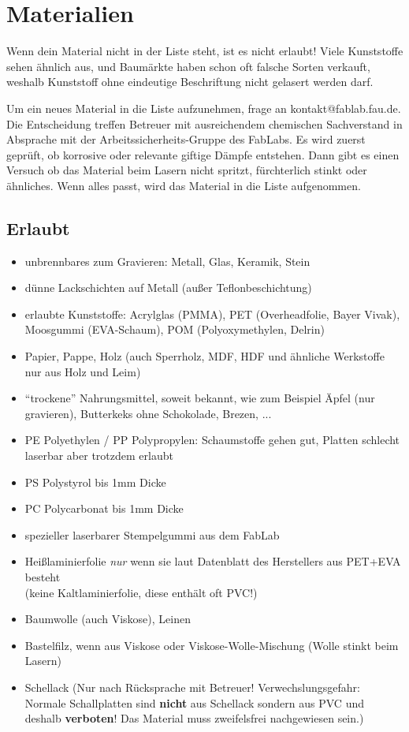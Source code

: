 \documentclass{\basedir/fablab-document}
\begin{document}
	\newpage %

	\section{Materialien}
	Wenn dein Material nicht in der Liste steht, ist es nicht erlaubt! Viele Kunststoffe sehen ähnlich aus, und Baumärkte haben schon oft falsche Sorten verkauft, weshalb Kunststoff ohne eindeutige Beschriftung nicht gelasert werden darf.

	Um ein neues Material in die Liste aufzunehmen, frage an kontakt@fablab.fau.de. Die Entscheidung treffen Betreuer mit ausreichendem chemischen Sachverstand in Absprache mit der Arbeitssicherheits-Gruppe des FabLabs. Es wird zuerst geprüft, ob korrosive oder relevante giftige Dämpfe entstehen. Dann gibt es einen Versuch ob das Material beim Lasern nicht spritzt, fürchterlich stinkt oder ähnliches. Wenn alles passt, wird das Material in die Liste aufgenommen.

	\subsection{Erlaubt}
	\newcommand{\itemCheck}{\item[\checkmark]}
	\begin{itemize}
		\itemCheck unbrennbares zum Gravieren: Metall, Glas, Keramik, Stein
		\itemCheck dünne Lackschichten auf Metall (außer Teflonbeschichtung)
		\itemCheck erlaubte Kunststoffe: Acrylglas (PMMA), PET (Overheadfolie, Bayer Vivak), Moosgummi (EVA-Schaum), POM (Polyoxymethylen, Delrin)
		\itemCheck Papier, Pappe, Holz (auch Sperrholz, MDF, HDF und ähnliche Werkstoffe nur aus Holz und Leim)
		\itemCheck \enquote{trockene} Nahrungsmittel, soweit bekannt, wie zum Beispiel Äpfel (nur gravieren), Butterkeks ohne Schokolade, Brezen, ...
		\itemCheck PE Polyethylen / PP Polypropylen: Schaumstoffe gehen gut, Platten schlecht laserbar aber trotzdem erlaubt
		\itemCheck PS Polystyrol bis 1mm Dicke
		\itemCheck PC Polycarbonat bis 1mm Dicke
		\itemCheck spezieller laserbarer Stempelgummi aus dem FabLab
		\itemCheck Heißlaminierfolie \emph{nur} wenn sie laut Datenblatt des Herstellers aus PET+EVA besteht\\(keine Kaltlaminierfolie, diese enthält oft PVC!)
		\itemCheck Baumwolle (auch Viskose), Leinen
		\itemCheck Bastelfilz, wenn aus Viskose oder Viskose-Wolle-Mischung (Wolle stinkt beim Lasern)
		\itemCheck Schellack (Nur nach Rücksprache mit Betreuer! Verwechslungsgefahr: Normale Schallplatten sind \textbf{nicht} aus Schellack sondern aus PVC und deshalb \textbf{verboten}! Das Material muss zweifelsfrei nachgewiesen sein.)
	\end{itemize}
\end{document}
